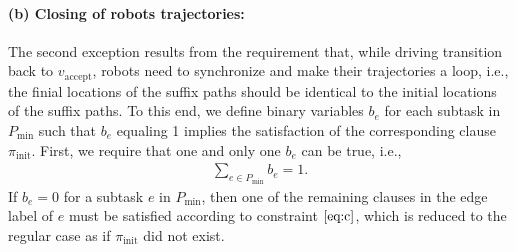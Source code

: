 \documentclass[Afour,sageh,times]{sagej}
\newcommand{\auto}[1]{\ccalA_{\textup{#1}}}
\newcommand{\vertex}[1]{v_{\textup{#1}}}
\begin{document}
{{%
\paragraph{\quad (b) Closing of robots trajectories:} The second exception results from the requirement that, while driving transition back to $v_{\text{accept}}$, robots need to synchronize and make their trajectories a loop, i.e., the finial locations of the suffix paths should be identical to the initial locations of the suffix paths.
To this end, we define binary variables $b_e$ for each subtask in $P_{\text{min}}$ such that $b_e$ equaling 1 implies the satisfaction of the corresponding clause $\pi_{\text{init}}$. First, we require that one  and only one $b_e$ can be true, i.e.,
\begin{align}
  \sum_{e \in P_{\text{min}}} b_e = 1.
\end{align}
If $b_e=0$ for a subtask $e$ in $P_{\text{min}}$, then one of the remaining clauses in the edge label of $e$ must be satisfied according to constraint $\eqref{eq:c}$, which is reduced to the regular case as if $\pi_{\text{init}}$ did not exist.

}}
\end{document}
